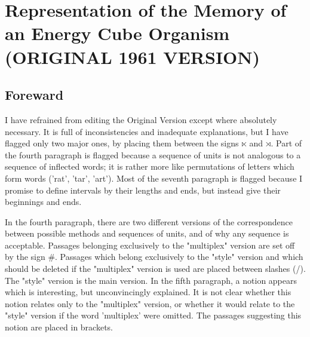 \documentclass[10pt,twoside,draft]{memoir}
\begin{document}
{{\chapter{Representation of the Memory of an Energy Cube Organism (ORIGINAL 1961 VERSION)}

\section*{Foreward}

I have refrained from editing the Original Version except where 
absolutely necessary. It is full of inconsistencies and inadequate 
explanations, but I have flagged only two major ones, by placing them 
between the signs $\ltimes$ and $\rtimes$. Part of the fourth paragraph is flagged because a 
sequence of units is not analogous to a sequence of inflected words; it is 
rather more like permutations of letters which form words ('rat', 'tar', 'art'). 
Most of the seventh paragraph is flagged because I promise to define intervals 
by their lengths and ends, but instead give their beginnings and ends. 

In the fourth paragraph, there are two different versions of the 
correspondence between possible methods and sequences of units, and of 
why any sequence is acceptable. Passages belonging exclusively to the 
"multiplex" version are set off by the sign \#. Passages which belong 
exclusively to the "style" version and which should be deleted if the 
"multiplex" version is used are placed between slashes (\slash). The "style" version is 
the main version. In the fifth paragraph, a notion appears which is 
interesting, but unconvincingly explained. It is not clear whether this notion 
relates only to the "multiplex" version, or whether it would relate to the 
"style" version if the word 'multiplex' were omitted. The passages suggesting 
this notion are placed in brackets. 

}}
\end{document}

